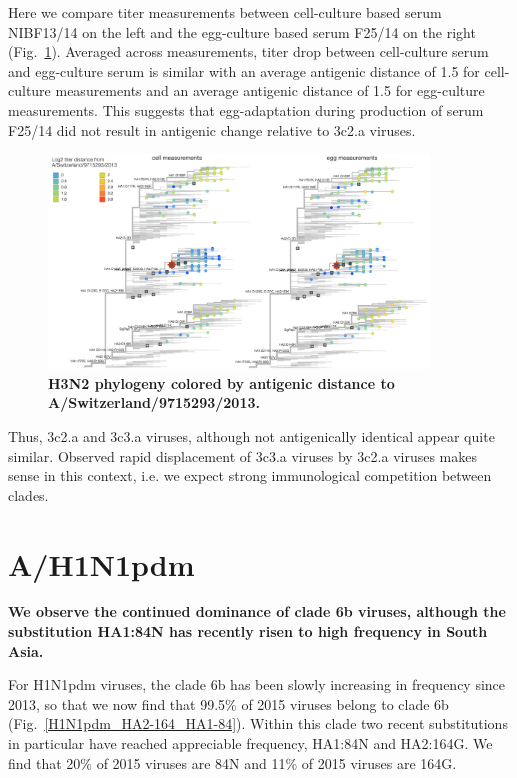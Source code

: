 \documentclass[11pt,oneside,letterpaper]{article}
\begin{document}
Here we compare titer measurements between cell-culture based serum NIBF13/14 on the left and the egg-culture based serum F25/14 on the right (Fig.~\ref{H3N2_HI_titers_ce}). Averaged across measurements, titer drop between cell-culture serum and egg-culture serum is similar with an average antigenic distance of 1.5 for cell-culture measurements and an average antigenic distance of 1.5 for egg-culture measurements. This suggests that egg-adaptation during production of serum F25/14 did not result in antigenic change relative to 3c2.a viruses.

\begin{figure}[h!]
	\centering		
	\includegraphics[width=0.9\textwidth]{../figures/sep-2015/H3N2_HI_titers_ce.png}
	\caption{\textbf{H3N2 phylogeny colored by antigenic distance to A/Switzerland/9715293/2013.} 
	}
	\label{H3N2_HI_titers_ce}
\end{figure}

Thus, 3c2.a and 3c3.a viruses, although not antigenically identical appear quite similar. Observed rapid displacement of 3c3.a viruses by 3c2.a viruses makes sense in this context, i.e. we expect strong immunological competition between clades.

\clearpage
\pagebreak

\section*{A/H1N1pdm}

\textbf{We observe the continued dominance of clade 6b viruses, although the substitution HA1:84N has recently risen to high frequency in South Asia.}

For H1N1pdm viruses, the clade 6b has been slowly increasing in frequency since 2013, so that we now find that 99.5\% of 2015 viruses belong to clade 6b (Fig.~\ref{H1N1pdm_HA2-164_HA1-84}). Within this clade two recent substitutions in particular have reached appreciable frequency, HA1:84N and HA2:164G. We find that 20\% of 2015 viruses are 84N and 11\% of 2015 viruses are 164G.
\end{document}
